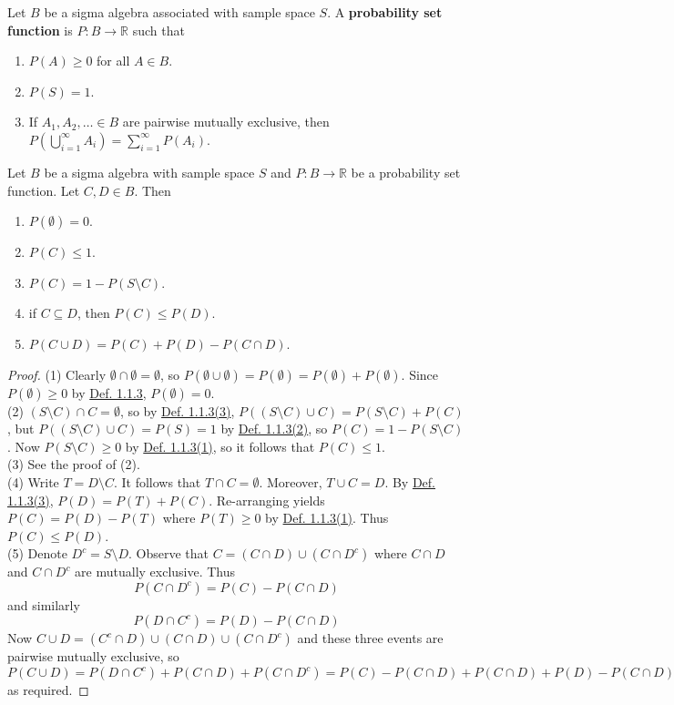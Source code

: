 \documentclass[11pt,fleqn]{book} %
\begin{document}
\begin{definition}
\label{def:113} 
Let \(B\) be a sigma algebra associated with sample space \(S\). A \textbf{probability set function} is \(P: B\rightarrow \mathbb{R}\) such that
\begin{enumerate}
\item \label{def:113a} \(P(A) \geq 0 \) for all \(A \in B\).
\item \label{def:113b} \(P(S) = 1\).
\item \label{def:113c} If \(A_1, A_2, \ldots \in B\) are pairwise mutually exclusive, then \(P\left(\bigcup_{i=1}^\infty A_i\right) = \sum_{i=1}^\infty P(A_i)\).
\end{enumerate}
\end{definition}

\begin{proposition}
Let \(B\) be a sigma algebra with sample space \(S\) and \(P:B\rightarrow\mathbb{R}\) be a probability set function. Let \(C, D \in B\). Then
\begin{enumerate}
\item \(P(\emptyset) = 0\).
\item \(P(C) \leq 1\).
\item \(P(C) = 1 - P(S \setminus C)\).
\item if \(C \subseteq D\), then \(P(C) \leq P(D)\).
\item \label{prop:114e} \(P(C \cup D) = P(C) + P(D) - P(C \cap D)\).
\end{enumerate}
\end{proposition}
\begin{proof}
(1) Clearly \(\emptyset \cap \emptyset = \emptyset\), so \(P(\emptyset \cup \emptyset) = P(\emptyset) = P(\emptyset) + P(\emptyset)\). Since \(P(\emptyset) \geq 0\) by \hyperref[def:113]{Def. 1.1.3}, \(P(\emptyset) = 0\).\\
(2) \((S \setminus C) \cap C = \emptyset\), so by \hyperref[def:113c]{Def. 1.1.3(3)}, \(P((S \setminus C) \cup C) = P(S \setminus C) + P(C)\), but \(P((S \setminus C) \cup C) = P(S) = 1\) by \hyperref[def:113b]{Def. 1.1.3(2)}, so \(P(C) = 1 - P(S \setminus C)\). Now \(P(S \setminus C) \geq 0\) by \hyperref[def:113a]{Def. 1.1.3(1)}, so it follows that \(P(C) \leq 1\).\\
(3) See the proof of (2).\\
(4) Write \(T = D \setminus C\). It follows that \(T \cap C = \emptyset\). Moreover, \(T \cup C = D\). By \hyperref[def:113c]{Def. 1.1.3(3)}, \(P(D) = P(T) + P(C)\). Re-arranging yields \(P(C) = P(D) - P(T)\) where \(P(T) \geq 0\) by \hyperref[def:113a]{Def. 1.1.3(1)}. Thus \(P(C) \leq P(D)\).\\
(5) Denote \(D^c = S \setminus D\). Observe that \(C = (C \cap D) \cup (C \cap D^c)\) where \(C \cap D\) and \(C \cap D^c\) are mutually exclusive. Thus
\[
P(C \cap D^c) = P(C) - P(C \cap D)
\]
and similarly
\[
P(D \cap C^c) = P(D) - P(C \cap D)
\]
Now \(C \cup D = (C^c \cap D) \cup (C \cap D) \cup (C \cap D^c)\) and these three events are pairwise mutually exclusive, so \(P(C \cup D) = P(D \cap C^c) + P(C \cap D) + P(C \cap D^c) = P(C) - P(C \cap D) + P(C \cap D) + P(D) - P(C\cap D) = P(C) + P(D) - P(C \cap D)\) as required.
\end{proof}
\end{document}
